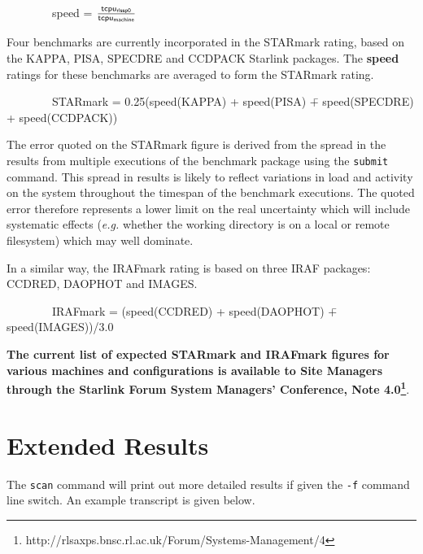 \documentclass[11pt]{article}
\newcommand{\htmladdnormallinkfoot}[2]{#1\footnote{#2}}
\begin{document}
\vspace{5mm}
\begin{large}
~~~~~~~~speed = $\frac{{\sf tcpu_{rlssp0}}}{{\sf tcpu_{machine}}}$
\end{large}
\vspace{5mm}

Four benchmarks are currently incorporated in the STARmark rating,
based on the KAPPA, PISA, SPECDRE and CCDPACK Starlink packages. The
{\bf speed} ratings for these benchmarks are averaged to form the 
STARmark rating.

\begin{tabbing}
~~~~~~~~STARmark = 0.25(speed(KAPPA) + speed(PISA) \=+ speed(SPECDRE)  \\
                                                     \>+ speed(CCDPACK))
\end{tabbing}

The error quoted on the STARmark figure is derived from the spread in
the results from multiple executions of the benchmark package using the
{\tt submit} command.  This spread in results is likely to reflect
variations in load and activity on the system throughout the timespan
of the benchmark executions. The quoted error therefore represents a
lower limit on the real uncertainty which will include systematic
effects ({\em e.g.} whether the working directory is on a local or
remote filesystem) which may well dominate.

In a similar way, the IRAFmark rating is based on three IRAF
packages: CCDRED, DAOPHOT and IMAGES.

\begin{tabbing}
~~~~~~~~IRAFmark = (speed(CCDRED) + speed(DAOPHOT) \=+ speed(IMAGES))/3.0  \\
\end{tabbing}


{\bf The current list of expected STARmark and IRAFmark figures for various
machines and configurations is available to Site Managers through the
Starlink Forum System Managers' Conference, \htmladdnormallinkfoot{Note 4.0}{http://rlsaxps.bnsc.rl.ac.uk/Forum/Systems-Management/4}}.


\section{Extended Results}
\label{results}

The {\tt scan} command will print out more detailed results if given
the {\tt -f} command line switch. An example transcript is given below.
 
\end{document}
